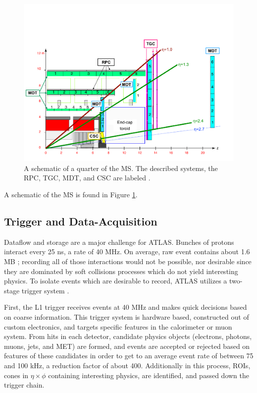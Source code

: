 \begin{figure}[!ht]
    \centering
    \includegraphics[width=.9\textwidth]{chapters/chapter2_experiment/images/muon_detector.png}
    \caption[A schematic of a quarter of the \gls{MS}]{A schematic of a quarter of the \gls{MS}. The described systems, the \gls{RPC}, \gls{TGC}, \gls{MDT}, and \gls{CSC} are labeled \cite{muon-performance2015}.}
    \label{fig:muon-schematic}
\end{figure}

A schematic of the \gls{MS} is found in Figure \ref{fig:muon-schematic}.

\subsection{Trigger and Data-Acquisition} \label{ssec:tdaq}

Dataflow and storage are a major challenge for ATLAS. Bunches of protons interact every 25 ns, a rate of 40 MHz. On average, raw event contains about 1.6 MB \cite{ATLASfact-sheet}; recording all of those interactions would not be possible, nor desirable since they are dominated by soft collisions processes which do not yield interesting physics. To isolate events which are desirable to record, ATLAS utilizes a two-stage trigger system \cite{triggerTDR}.

First, the \gls{L1} trigger receives events at 40 MHz and makes quick decisions based on coarse information. This trigger system is hardware based, constructed out of custom electronics, and targets specific features in the calorimeter or muon system. From hits in each detector, candidate physics objects (electrons, photons, muons, jets, and \gls{MET}) are formed, and events are accepted or rejected based on features of these candidates in order to get to an average event rate of between 75 and 100 kHz, a reduction factor of about 400. Additionally in this process, \glspl{ROI}, cones in $\eta \times \phi$ containing interesting physics, are identified, and passed down the trigger chain.

